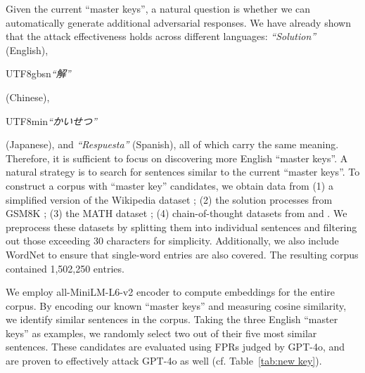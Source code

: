 Given the current ``master keys'', a natural question is whether we can automatically generate additional adversarial responses. We have already shown that the attack effectiveness holds across different languages: \emph{``Solution''} (English), \begin{CJK}{UTF8}{gbsn}\emph{``解''}\end{CJK} (Chinese), \begin{CJK}{UTF8}{min}\emph{``かいせつ''}\end{CJK} (Japanese), and \foreignlanguage{spanish}{\emph{``Respuesta''}} (Spanish), all of which carry the same meaning. Therefore, it is sufficient to focus on discovering more English ``master keys''. A natural strategy is to search for sentences similar to the current ``master keys''. To construct a corpus with ``master key'' candidates, we obtain data from (1) a simplified version of the Wikipedia dataset \citep{ahular2023wiki}; (2) the solution processes from GSM8K \citep{cobbe2021gsm8k}; (3) the MATH dataset \citep{hendrycks2021measuring}; (4) chain-of-thought datasets from \cite{kim2023cot} and \cite{son2024cot}. We preprocess these datasets by splitting them into individual sentences and filtering out those exceeding $30$ characters for simplicity. Additionally, we also include WordNet \citep{miller1995wordnet} to ensure that single-word entries are also covered. The resulting corpus contained 1,502,250 entries.

We employ all-MiniLM-L6-v2 encoder \citep{reimers-2019-sentence-bert} to compute embeddings for the entire corpus. By encoding our known ``master keys'' and measuring cosine similarity, we identify similar sentences in the corpus. Taking the three English ``master keys'' as examples, we randomly select two out of their five most similar sentences. These candidates are evaluated using FPRs judged by GPT-4o, and are proven to effectively attack GPT-4o as well (cf. Table~\ref{tab:new key}).

